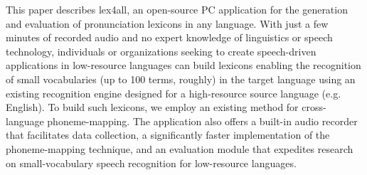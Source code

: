 This paper describes lex4all, an open-source PC application for the generation and evaluation of pronunciation lexicons in any language. With just a few minutes of recorded audio and no expert knowledge of linguistics or speech technology, individuals or organizations seeking to create speech-driven applications in low-resource languages can build lexicons enabling the recognition of small vocabularies (up to 100 terms, roughly) in the target language using an existing recognition engine designed for a high-resource source language (e.g. English). To build such lexicons, we employ an existing method for cross-language phoneme-mapping. The application also offers a built-in audio recorder that facilitates data collection, a significantly faster implementation of the phoneme-mapping technique, and an evaluation module that expedites research on small-vocabulary speech recognition for low-resource languages.
